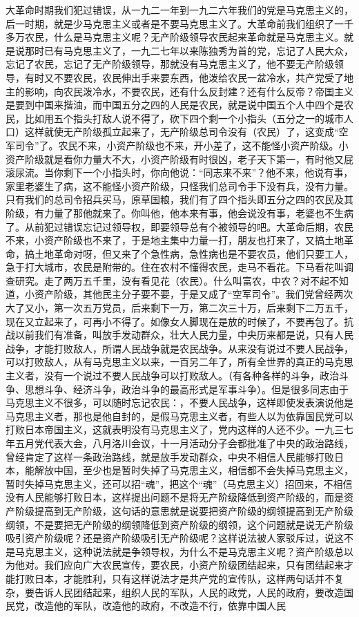大革命时期我们犯过错误，从一九二一年到一九二六年我们的党是马克思主义的，后一时期，就是少马克思主义或者是不要马克思主义了。大革命前我们组织了一千多万农民，什么是马克思主义呢？无产阶级领导农民起来革命就是马克思主义。就是说那时已有马克思主义了，一九二七年以来陈独秀为首的党，忘记了人民大众，忘记了农民，忘记了无产阶级领导，那就没有马克思主义了，他不要无产阶级领导，有时又不要农民，农民伸出手来要东西，他泼给农民一盆冷水，共产党受了地主的影响，向农民泼冷水，不要农民，还有什么反封建？还有什么反帝？帝国主义是要到中国来揩油，而中国五分之四的人民是农民，就是说中国五个人中四个是农民，比如用五个指头打敌人说不得了，砍下四个剩一个小指头（五分之一的城市人口）这样就使无产阶级孤立起来了，无产阶级总司令没有（农民）了，这变成“空军司令”了。农民不来，小资产阶级也不来，开小差了，这不能怪小资产阶级。小资产阶级就是看你力量大不大，小资产阶级有时很凶，老子天下第一，有时他又屁滚尿流。当你剩下一个小指头时，你向他说：“同志来不来”？他不来，他说有事，家里老婆生了病，这不能怪小资产阶级，只怪我们总司令手下没有兵，没有力量。只有我们的总司令招兵买马，原草国粮，我们有了四个指头即五分之四的农民及其阶级，有力量了那他就来了。你叫他，他本来有事，他会说没有事，老婆也不生病了。从前犯过错误忘记过领导权，即要领导总有个被领导的吧。大革命后期，农民不来，小资产阶级也不来了，于是地主集中力量一打，朋友也打来了，又搞土地革命，搞土地革命对呀，但又来了个急性病，急性病也是不要农员，他们只要工人，急于打大城市，农民是附带的。住在农村不懂得农民，走马不看花。下马看花叫调查研究。走了两万五千里，没有看见花（农民）。什么叫富农，中农？对不起不知道，小资产阶级，其他民主分子要不要，于是又成了“空军司令”。我们党曾经两次大了又小，第一次五万党员，后来剩下一万，第二次三十万，后来剩下二万五千，现在又立起来了，可再小不得了。如像女人脚现在是放的时候了，不要再包了。抗战以前我们有准备，叫放手发动群众，壮大人民力量，中央历来都是说，只有人民战争，才能打败敌人，所谓人民战争就是农民战争。从来没有说过不要人民战争，可以打败敌人，从有马克思主义以来，一百另二年了，所有全世界的真正的马克思主义者，没有一个说过不要人民战争可以打败敌人。（有各种各样的斗争，政治斗争、思想斗争、经济斗争，政治斗争的最高形式是军事斗争）。但是很多同志由于马克思主义不很多，可以随时忘记农民：，不要人民战争，这样即使发表演说他是马克思主义者，那也是他自封的，是假马克思主义者，有些人以为依靠国民党可以打败日本帝国主义，这就表明没有马克思主义了，党内这样的人还不少。一九三七年五月党代表大会，八月洛川会议，十一月活动分子会都批准了中央的政治路线，曾经肯定了这样一条政治路线，就是放手发动群众，中央不相信人民能够打败日本，能解放中国，至少也是暂时失掉了马克思主义，相信都不会失掉马克思主义，暂时失掉马克思主义，还可以招“魂”，把这个“魂”（马克思主义）招回来，不相信没有人民能够打败日本，这样提出问题不是将无产阶级降低到资产阶级的，而是资产阶级提高到无产阶级，这句话的意思就是说要把资产阶级的纲领提高到无产阶级纲领，不是要把无产阶级的纲领降低到资产阶级的纲领，这个问题就是说无产阶级吸引资产阶级呢？还是资产阶级吸引无产阶级呢？这样说法被人家驳斥过，说这不是马克思主义，这种说法就是争领导权，为什么不是马克思主义呢？资产阶级总以为他对。我们应向广大农民宣传，要农民，小资产阶级团结起来，只有团结起来才能打败日本，才能胜利，只有这样说法才是共产党的宣传队，这样两句话并不复杂，要告诉人民团结起来，组织人民的军队，人民的政党，人民的政府，要改造国民党，改造他的军队，改造他的政府，不改造不行，依靠中国人民